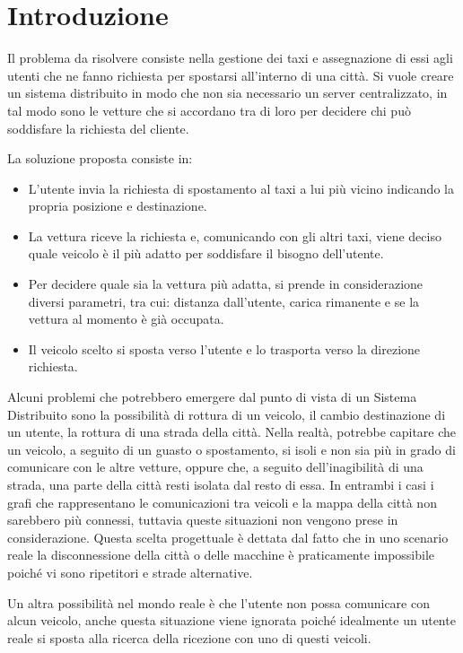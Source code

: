 \chapter{Introduzione}

Il problema da risolvere consiste nella gestione dei taxi e assegnazione di essi agli utenti che ne fanno richiesta per spostarsi all'interno di una città. Si vuole creare un sistema distribuito in modo che non sia necessario un server centralizzato, in tal modo sono le vetture che si accordano tra di loro per decidere chi può soddisfare la richiesta del cliente.

La soluzione proposta consiste in:
\begin{itemize}
	\item L'utente invia la richiesta di spostamento al taxi a lui più vicino indicando la propria posizione e destinazione.
	\item La vettura riceve la richiesta e, comunicando con gli altri taxi, viene deciso quale veicolo è il più adatto per soddisfare il bisogno dell'utente.
	\item Per decidere quale sia la vettura più adatta, si prende in considerazione diversi parametri, tra cui: distanza dall'utente, carica rimanente e se la vettura al momento è già occupata.
	\item Il veicolo scelto si sposta verso l'utente e lo trasporta verso la direzione richiesta.
\end{itemize}

Alcuni problemi che potrebbero emergere dal punto di vista di un Sistema Distribuito sono la possibilità di rottura di un veicolo, il cambio destinazione di un utente, la rottura di una strada della città.
Nella realtà, potrebbe capitare che un veicolo, a seguito di un guasto o spostamento, si isoli e non sia più in grado di comunicare con le altre vetture, oppure che, a seguito dell'inagibilità di una strada, una parte della città resti isolata dal resto di essa. In entrambi i casi i grafi che rappresentano le comunicazioni tra veicoli e la mappa della città non sarebbero più connessi, tuttavia queste situazioni non vengono prese in considerazione. 
Questa scelta progettuale è dettata dal fatto che in uno scenario reale la disconnessione della città o delle macchine è praticamente impossibile poiché vi sono ripetitori e strade alternative.

Un altra possibilità nel mondo reale è che l'utente non possa comunicare con alcun veicolo, anche questa situazione viene ignorata poiché idealmente un utente reale si sposta alla ricerca della ricezione con uno di questi veicoli.

